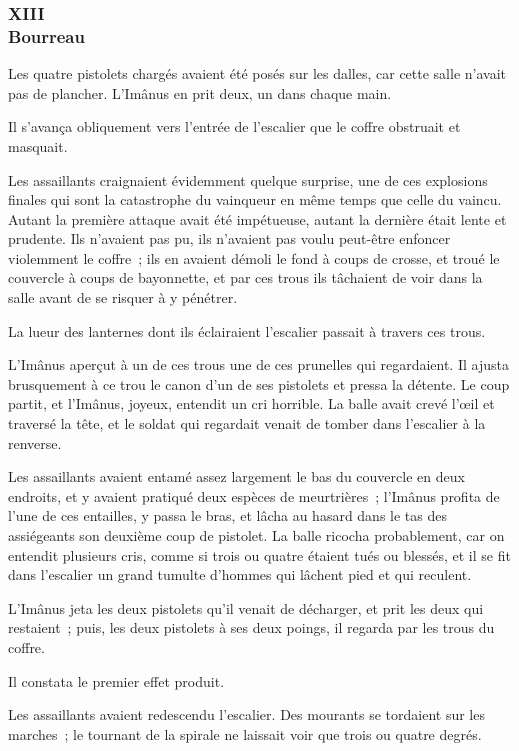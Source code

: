 \documentclass[french,twoside]{book} %
\begin{document}
 \subsubsection[{XIII. Bourreau}]{XIII \\
Bourreau}
\label{p3l4c13}
\noindent Les quatre pistolets chargés avaient été posés sur les dalles, car cette salle n’avait pas de plancher. L’Imânus en prit deux, un dans chaque main.\par
Il s’avança obliquement vers l’entrée de l’escalier que le coffre obstruait et masquait.\par
Les assaillants craignaient évidemment quelque surprise, une de ces explosions finales qui sont la catastrophe du vainqueur en même temps que celle du vaincu. Autant la première attaque avait été impétueuse, autant la dernière était lente et prudente. Ils n’avaient pas pu, ils n’avaient pas voulu peut-être enfoncer violemment le coffre ; ils en avaient démoli le fond à coups de crosse, et troué le couvercle à coups de bayonnette, et par ces trous ils tâchaient de voir dans la salle avant de se risquer à y pénétrer.\par
La lueur des lanternes dont ils éclairaient l’escalier passait à travers ces trous.\par
L’Imânus aperçut à un de ces trous une de ces prunelles qui regardaient. Il ajusta brusquement à ce trou le canon d’un de ses pistolets et pressa la détente. Le coup partit, et l’Imânus, joyeux, entendit  un cri horrible. La balle avait crevé l’œil et traversé la tête, et le soldat qui regardait venait de tomber dans l’escalier à la renverse.\par
Les assaillants avaient entamé assez largement le bas du couvercle en deux endroits, et y avaient pratiqué deux espèces de meurtrières ; l’Imânus profita de l’une de ces entailles, y passa le bras, et lâcha au hasard dans le tas des assiégeants son deuxième coup de pistolet. La balle ricocha probablement, car on entendit plusieurs cris, comme si trois ou quatre étaient tués ou blessés, et il se fit dans l’escalier un grand tumulte d’hommes qui lâchent pied et qui reculent.\par
L’Imânus jeta les deux pistolets qu’il venait de décharger, et prit les deux qui restaient ; puis, les deux pistolets à ses deux poings, il regarda par les trous du coffre.\par
Il constata le premier effet produit.\par
Les assaillants avaient redescendu l’escalier. Des mourants se tordaient sur les marches ; le tournant de la spirale ne laissait voir que trois ou quatre degrés.\par
\end{document}
